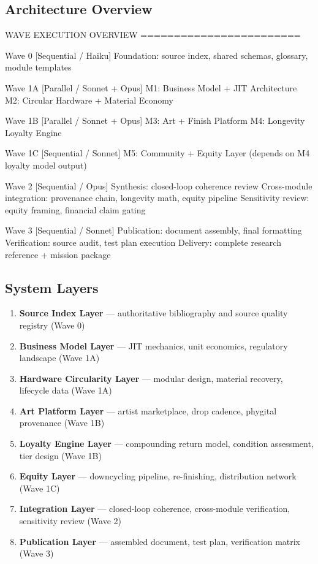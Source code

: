 \documentclass[11pt,letterpaper]{article}
\begin{document}
\subsection{Architecture Overview}

\begin{asciibox}
WAVE EXECUTION OVERVIEW
========================

Wave 0  [Sequential / Haiku]
  Foundation: source index, shared schemas, glossary, module templates

Wave 1A [Parallel / Sonnet + Opus]
  M1: Business Model + JIT Architecture
  M2: Circular Hardware + Material Economy

Wave 1B [Parallel / Sonnet + Opus]
  M3: Art + Finish Platform
  M4: Longevity Loyalty Engine

Wave 1C [Sequential / Sonnet]
  M5: Community + Equity Layer
  (depends on M4 loyalty model output)

Wave 2  [Sequential / Opus]
  Synthesis: closed-loop coherence review
  Cross-module integration: provenance chain, longevity math, equity pipeline
  Sensitivity review: equity framing, financial claim gating

Wave 3  [Sequential / Sonnet]
  Publication: document assembly, final formatting
  Verification: source audit, test plan execution
  Delivery: complete research reference + mission package
\end{asciibox}

\subsection{System Layers}
\begin{enumerate}[noitemsep]
  \item \textbf{Source Index Layer} --- authoritative bibliography and source quality registry (Wave 0)
  \item \textbf{Business Model Layer} --- JIT mechanics, unit economics, regulatory landscape (Wave 1A)
  \item \textbf{Hardware Circularity Layer} --- modular design, material recovery, lifecycle data (Wave 1A)
  \item \textbf{Art Platform Layer} --- artist marketplace, drop cadence, phygital provenance (Wave 1B)
  \item \textbf{Loyalty Engine Layer} --- compounding return model, condition assessment, tier design (Wave 1B)
  \item \textbf{Equity Layer} --- downcycling pipeline, re-finishing, distribution network (Wave 1C)
  \item \textbf{Integration Layer} --- closed-loop coherence, cross-module verification, sensitivity review (Wave 2)
  \item \textbf{Publication Layer} --- assembled document, test plan, verification matrix (Wave 3)
\end{enumerate}
\end{document}
